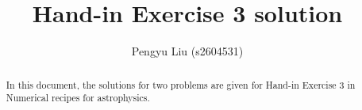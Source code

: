 \documentclass[a4paper,10pt]{article}
\title{Hand-in Exercise 3 solution}
\author{Pengyu Liu (s2604531)}
\begin{document}
\maketitle

\begin{abstract}
In this document, the solutions for two problems are given for Hand-in Exercise 3 in Numerical recipes for astrophysics.

\end{abstract}




\end{document}
